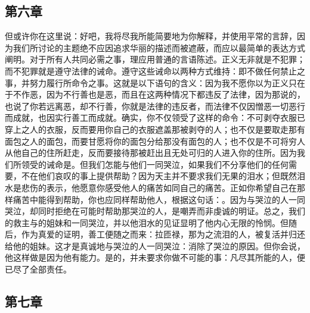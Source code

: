
\subsection{第六章}

但或许你在这里说：好吧，我将尽我所能简要地为你解释，并使用平常的言辞，因为我们所讨论的主题绝不应因追求华丽的描述而被遮蔽，而应以最简单的表达方式阐明。对于所有人共同必需之事，理应用普通的言语陈述。正义无非就是不犯罪；而不犯罪就是遵守法律的诫命。遵守这些诫命以两种方式维持：即不做任何禁止之事，并努力履行所命令之事。这就是以下语句的含义：因为我不愿你以为正义只在于不作恶，因为不行善也是恶，而且在这两种情况下都违反了法律，因为那说的，也说了你若远离恶，却不行善，你就是法律的违反者，而法律不仅因憎恶一切恶行而成就，也因实行善工而成就。确实，你不仅领受了这样的命令：不可剥夺衣服已穿上之人的衣服，反而要用你自己的衣服遮盖那被剥夺的人；也不仅是要取走那有面包之人的面包，而要甘愿将你的面包分给那没有面包的人；也不仅是不可将穷人从他自己的住所赶走，反而要接待那被赶出且无处可归的人进入你的住所。因为我们所领受的诫命是。但我们怎能与他们一同哭泣，如果我们不分享他们的任何需要，不在他们哀叹的事上提供帮助？因为天主并不要求我们无果的泪水；但既然泪水是悲伤的表示，他愿意你感受他人的痛苦如同自己的痛苦。正如你希望自己在那样痛苦中能得到帮助，你也应同样帮助他人，根据这句话：。因为与哭泣的人一同哭泣，却同时拒绝在可能时帮助那哭泣的人，是嘲弄而非虔诚的明证。总之，我们的救主与的姐妹和一同哭泣，并以他泪水的见证显明了他内心无限的怜悯。但随后，作为真爱的证明，善工便随之而来：拉匝禄，那为之流泪的人，被复活并归还给他的姐妹。这才是真诚地与哭泣的人一同哭泣：消除了哭泣的原因。但你会说，他这样做是因为他有能力。是的，并未要求你做不可能的事：凡尽其所能的人，便已尽了全部责任。\par


\subsection{第七章}

